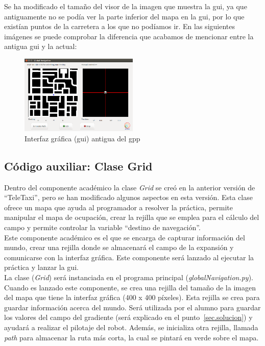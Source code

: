 Se ha modificado el tamaño del visor de la imagen que muestra la \acrshort{gui}, ya que antiguamente no se podía ver la parte inferior del mapa en la \acrshort{gui}, por lo que existían puntos de la carretera a los que no podíamos ir. En las siguientes imágenes se puede comprobar la diferencia que acabamos de mencionar entre la antigua \acrshort{gui} y la actual:
\begin{figure}[H]
  \begin{center}
    \includegraphics[width=0.5\textwidth]{figures/GPP/GUI_mal.png}
		\caption{Interfaz gráfica (\acrshort{gui}) antigua del \acrshort{gpp}}
		\label{fig.gui_mal}
		\end{center}
\end{figure}

\subsection{Código auxiliar: Clase Grid}
Dentro del componente académico la clase \textit{Grid} se creó en la anterior versión de ``TeleTaxi'', pero se han modificado algunos aspectos en esta versión. Esta clase ofrece un mapa que ayuda al programador a resolver la práctica, permite manipular el mapa de ocupación, crear la rejilla que se emplea para el cálculo del campo y permite controlar la variable ``destino de navegación''.\\

Este componente académico es el que se encarga de capturar información del mundo, crear una rejilla donde se almacenará el campo de la expansión y comunicarse con la interfaz gráfica. Este componente será lanzado al ejecutar la práctica y lanzar la \acrshort{gui}.\\

La clase (\textit{Grid}) será instanciada en el programa principal (\textit{globalNavigation.py}). Cuando es lanzado este componente, se crea una rejilla del tamaño de la imagen del mapa que tiene la interfaz gráfica (400 x 400 píxeles). Esta rejilla se crea para guardar información acerca del mundo. Será utilizada por el alumno para guardar los valores del campo del gradiente (será explicado en el punto~\ref{sec.solucion}) y ayudará a realizar el pilotaje del robot. Además, se inicializa otra rejilla, llamada \textit{path} para almacenar la ruta más corta, la cual se pintará en verde sobre el mapa.\\

